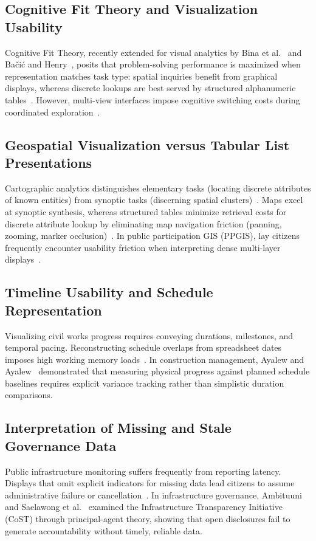 \documentclass[runningheads]{llncs}
\begin{document}
\subsection{Cognitive Fit Theory and Visualization Usability}
Cognitive Fit Theory, recently extended for visual analytics by Bina et al.~\cite{bina2023incorporating} and Ba{\v{c}}i{\'c} and Henry~\cite{bacic2022advancing}, posits that problem-solving performance is maximized when representation matches task type: spatial inquiries benefit from graphical displays, whereas discrete lookups are best served by structured alphanumeric tables~\cite{bina2023incorporating,bacic2022advancing}. However, multi-view interfaces impose cognitive switching costs during coordinated exploration~\cite{bacic2022advancing}.

\subsection{Geospatial Visualization versus Tabular List Presentations}
Cartographic analytics distinguishes elementary tasks (locating discrete attributes of known entities) from synoptic tasks (discerning spatial clusters)~\cite{duncan2021task}. Maps excel at synoptic synthesis, whereas structured tables minimize retrieval costs for discrete attribute lookup by eliminating map navigation friction (panning, zooming, marker occlusion)~\cite{duncan2021task}. In public participation GIS (PPGIS), lay citizens frequently encounter usability friction when interpreting dense multi-layer displays~\cite{kytta2023prioritizing,johnson2024enhancing}.

\subsection{Timeline Usability and Schedule Representation}
Visualizing civil works progress requires conveying durations, milestones, and temporal pacing. Reconstructing schedule overlaps from spreadsheet dates imposes high working memory loads~\cite{tang2024comparative,bacic2022advancing}. In construction management, Ayalew and Ayalew~\cite{ayalew2024developing} demonstrated that measuring physical progress against planned schedule baselines requires explicit variance tracking rather than simplistic duration comparisons.

\subsection{Interpretation of Missing and Stale Governance Data}
Public infrastructure monitoring suffers frequently from reporting latency. Displays that omit explicit indicators for missing data lead citizens to assume administrative failure or cancellation~\cite{fernstad2022explore}. In infrastructure governance, Ambituuni~\cite{ambituuni2025infrastructure} and Saelawong et al.~\cite{saelawong2024transparency} examined the Infrastructure Transparency Initiative (CoST) through principal-agent theory, showing that open disclosures fail to generate accountability without timely, reliable data.
\end{document}
